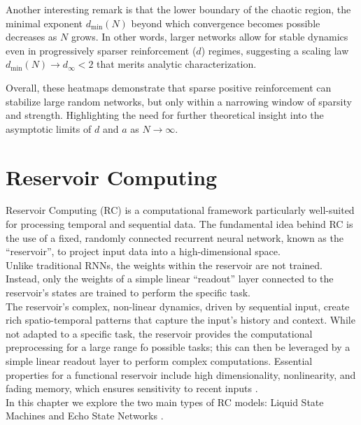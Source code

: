 \documentclass[a4paper,12pt]{report}
\begin{document}
Another interesting remark is that the lower boundary of the 
chaotic region, the minimal exponent \(d_{\min}(N)\) beyond which 
convergence becomes possible decreases as \(N\) grows. 
In other words, larger networks allow for stable dynamics even in 
progressively sparser reinforcement (\(d\)) regimes, suggesting a scaling 
law \(d_{\min}(N)\to d_\infty<2\) that merits analytic characterization.

Overall, these heatmaps demonstrate that sparse positive reinforcement 
can stabilize large random networks, but only within a narrowing 
window of sparsity and strength. Highlighting the need for further 
theoretical insight into the asymptotic limits of \(d\) and \(a\) 
as \(N\to\infty\).  






\chapter{Reservoir Computing}
Reservoir Computing (RC) is a computational framework particularly well-suited for 
processing temporal and sequential data. The fundamental idea behind RC is the use of a 
fixed, randomly connected recurrent neural network, known as the ``reservoir'', to 
project input data into a high-dimensional space. \\
Unlike traditional RNNs, the weights within the reservoir are not trained. Instead, 
only the weights of a simple linear ``readout'' layer connected to the reservoir's states 
are trained to perform the specific task.\\
The reservoir's complex, non-linear dynamics, driven by sequential input, create rich 
spatio-temporal patterns that capture the input's history and context. While not adapted 
to a specific task, the reservoir provides the computational preprocessing for a large
range fo possible tasks; this can then be leveraged by a simple linear readout layer to 
perform complex computations. 
Essential properties for a functional reservoir include high dimensionality, nonlinearity, 
and fading memory, which ensures sensitivity to recent inputs \cite{TANAKA2019100}.\\
In this chapter we explore the two main types of RC models: Liquid State Machines
\cite{Maass2002} and Echo State Networks \cite{Jaeger2001}.
\end{document}
